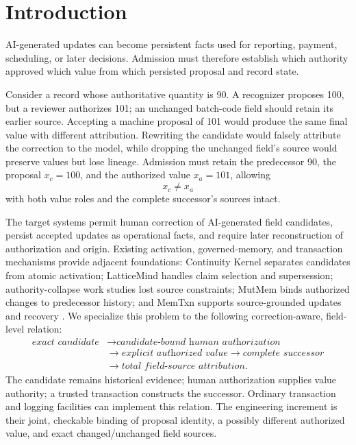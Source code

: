 \section{Introduction}
\label{sec:introduction}

AI-generated updates can become persistent facts used for reporting, payment, scheduling, or later decisions. Admission must therefore establish which authority approved which value from which persisted proposal and record state.

Consider a record whose authoritative quantity is 90. A recognizer proposes 100, but a reviewer authorizes 101; an unchanged batch-code field should retain its earlier source. Accepting a machine proposal of 101 would produce the same final value with different attribution. Rewriting the candidate would falsely attribute the correction to the model, while dropping the unchanged field's source would preserve values but lose lineage. Admission must retain the predecessor 90, the proposal $x_c=100$, and the authorized value $x_a=101$, allowing
\begin{equation}
x_c\neq x_a
\label{eq:intro-correction}
\end{equation}
with both value roles and the complete successor's sources intact.

The target systems permit human correction of AI-generated field candidates, persist accepted updates as operational facts, and require later reconstruction of authorization and origin. Existing activation, governed-memory, and transaction mechanisms provide adjacent foundations: Continuity Kernel separates candidates from atomic activation; LatticeMind handles claim selection and supersession; authority-collapse work studies lost source constraints; MutMem binds authorized changes to predecessor history; and MemTxn supports source-grounded updates and recovery \citep{he2026continuity,zhou2026latticemind,zhan2026authoritycollapse,saidi2026mutmem,cui2026memtxn}. We specialize this problem to the following correction-aware, field-level relation:
\begin{equation}
\begin{aligned}
\textit{exact candidate}
&\rightarrow\textit{candidate-bound human authorization}\\
&\rightarrow\textit{explicit authorized value}
\rightarrow\textit{complete successor}\\
&\rightarrow\textit{total field-source attribution}.
\end{aligned}
\label{eq:admission-chain}
\end{equation}
The candidate remains historical evidence; human authorization supplies value authority; a trusted transaction constructs the successor. Ordinary transaction and logging facilities can implement this relation. The engineering increment is their joint, checkable binding of proposal identity, a possibly different authorized value, and exact changed/unchanged field sources.

